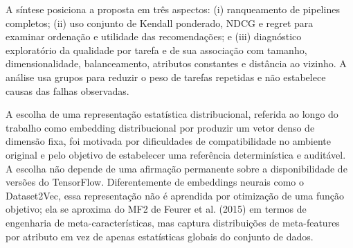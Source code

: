 \begin{table}[H]
\centering
\caption{Comparativo entre trabalhos relacionados e a proposta deste TCC}
\label{tab:comparativo}
\fonte{}
\end{table}

A síntese posiciona a proposta em três aspectos: (i) ranqueamento de pipelines completos; (ii) uso conjunto de Kendall ponderado, NDCG e regret para examinar ordenação e utilidade das recomendações; e (iii) diagnóstico exploratório da qualidade por tarefa e de sua associação com tamanho, dimensionalidade, balanceamento, atributos constantes e distância ao vizinho. A análise usa grupos para reduzir o peso de tarefas repetidas e não estabelece causas das falhas observadas.

A escolha de uma representação estatística distribucional, referida ao longo do trabalho como embedding distribucional por produzir um vetor denso de dimensão fixa, foi motivada por dificuldades de compatibilidade no ambiente original e pelo objetivo de estabelecer uma referência determinística e auditável. A escolha não depende de uma afirmação permanente sobre a disponibilidade de versões do TensorFlow. Diferentemente de embeddings neurais como o Dataset2Vec, essa representação não é aprendida por otimização de uma função objetivo; ela se aproxima do MF2 de Feurer et al. (2015) em termos de engenharia de meta-características, mas captura distribuições de meta-features por atributo em vez de apenas estatísticas globais do conjunto de dados.

